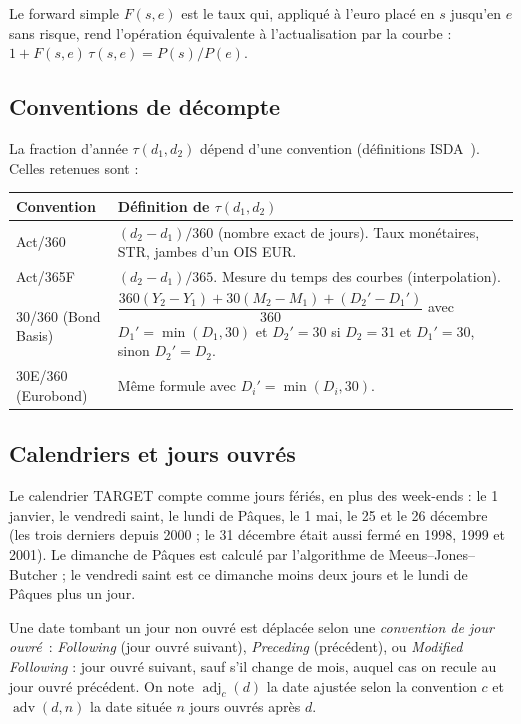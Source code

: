 \documentclass[11pt,a4paper]{article}
\newcommand{\estr}{\texorpdfstring{\texteuro STR}{EUR STR}}
\newcommand{\DF}[1]{P(#1)}
\DeclareMathOperator{\adj}{adj}
\DeclareMathOperator{\adv}{adv}
\theoremstyle{plain}
\theoremstyle{definition}
\theoremstyle{remark}
\begin{document}
Le forward simple $F(s,e)$ est le taux qui, appliqué à l'euro placé en $s$ jusqu'en $e$ sans risque,
rend l'opération équivalente à l'actualisation par la courbe : $1+F(s,e)\,\tau(s,e)=\DF{s}/\DF{e}$.

\subsection{Conventions de décompte}

La fraction d'année $\tau(d_1,d_2)$ dépend d'une convention (définitions ISDA~\cite{isda2006}).
Celles retenues sont :

\begin{center}
\begin{tabularx}{\linewidth}{@{}l>{\raggedright\arraybackslash}X@{}}
\toprule
Convention & Définition de $\tau(d_1,d_2)$\\
\midrule
Act/360 & $(d_2-d_1)/360$ (nombre exact de jours). Taux monétaires, \estr{}, jambes d'un OIS EUR.\\
Act/365F & $(d_2-d_1)/365$. Mesure du temps des courbes (interpolation).\\
30/360 (Bond Basis) &
  $\dfrac{360(Y_2-Y_1)+30(M_2-M_1)+(D_2'-D_1')}{360}$ avec $D_1'=\min(D_1,30)$ et $D_2'=30$ si
  $D_2=31$ et $D_1'=30$, sinon $D_2'=D_2$.\\
30E/360 (Eurobond) & Même formule avec $D_i'=\min(D_i,30)$.\\
\bottomrule
\end{tabularx}
\end{center}

\subsection{Calendriers et jours ouvrés}

Le calendrier TARGET compte comme jours fériés, en plus des week-ends : le 1\ier{} janvier, le
vendredi saint, le lundi de Pâques, le 1\ier{} mai, le 25 et le 26 décembre (les trois derniers
depuis 2000 ; le 31 décembre était aussi fermé en 1998, 1999 et 2001). Le dimanche de Pâques est
calculé par l'algorithme de Meeus--Jones--Butcher ; le vendredi saint est ce dimanche moins deux jours
et le lundi de Pâques plus un jour.

Une date tombant un jour non ouvré est déplacée selon une \emph{convention de jour ouvré}~:
\emph{Following} (jour ouvré suivant), \emph{Preceding} (précédent), ou \emph{Modified Following} :
jour ouvré suivant, sauf s'il change de mois, auquel cas on recule au jour ouvré précédent. On note
$\adj_c(d)$ la date ajustée selon la convention $c$ et $\adv(d,n)$ la date située $n$ jours ouvrés
après $d$.
\end{document}
